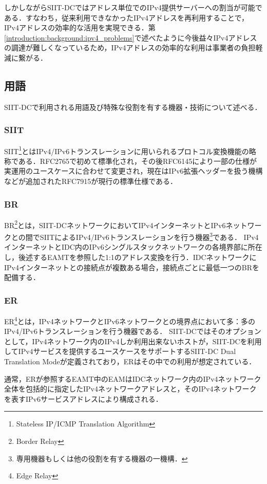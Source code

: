 しかしながらSIIT-DCではアドレス単位でのIPv4提供サーバーへの割当が可能である．すなわち，従来利用できなかったIPv4アドレスを再利用することで，IPv4アドレスの効率的な活用を実現できる．第\ref{introduction:background:ipv4_problems}で述べたように今後益々IPv4アドレスの調達が難しくなっているため，IPv4アドレスの効率的な利用は事業者の負担軽減に繋がる．

\subsection{用語}
\label{issue:siit-dc:terms}
SIIT-DCで利用される用語及び特殊な役割を有する機器・技術について述べる．

\subsubsection{SIIT}
SIIT\footnote{Stateless IP/ICMP Translation Algorithm}とはIPv4/IPv6トランスレーションに用いられるプロトコル変換機能の略称である．RFC2765\cite{RFC2765}で初めて標準化され，その後RFC6145\cite{RFC6145}により一部の仕様が実運用のユースケースに合わせて変更され，現在はIPv6拡張ヘッダーを扱う機構などが追加されたRFC7915\cite{RFC7915}が現行の標準仕様である．

\subsubsection{BR}
BR\footnote{Border Relay}とは，SIIT-DCネットワークにおいてIPv4インターネットとIPv6ネットワークとの間でSIITによるIPv4/IPv6トランスレーションを行う機器\footnote{専用機器もしくは他の役割を有する機器の一機構．}である．
IPv4インターネットとIDC内のIPv6シングルスタックネットワークの各境界部に所在し，後述するEAMTを参照した1:1のアドレス変換を行う．IDCネットワークにIPv4インターネットとの接続点が複数ある場合，接続点ごとに最低一つのBRを配備する．

\subsubsection{ER}
ER\footnote{Edge Relay}とは，IPv4ネットワークとIPv6ネットワークとの境界点において多：多のIPv4/IPv6トランスレーションを行う機器である．
SIIT-DCではそのオプションとして，IPv4ネットワーク内のIPv4しか利用出来ないホストが，SIIT-DCを利用してIPv4サービスを提供するユースケースをサポートするSIIT-DC Dual Translation Mode\cite{RFC7756}が定義されており，ERはその中での利用が想定されている．

通常，ERが参照するEAMT中のEAMはIDCネットワーク内のIPv4ネットワーク全体を包括的に指定したIPv4ネットワークアドレスと，そのIPv4ネットワークを表すIPv6サービスアドレスにより構成される．

